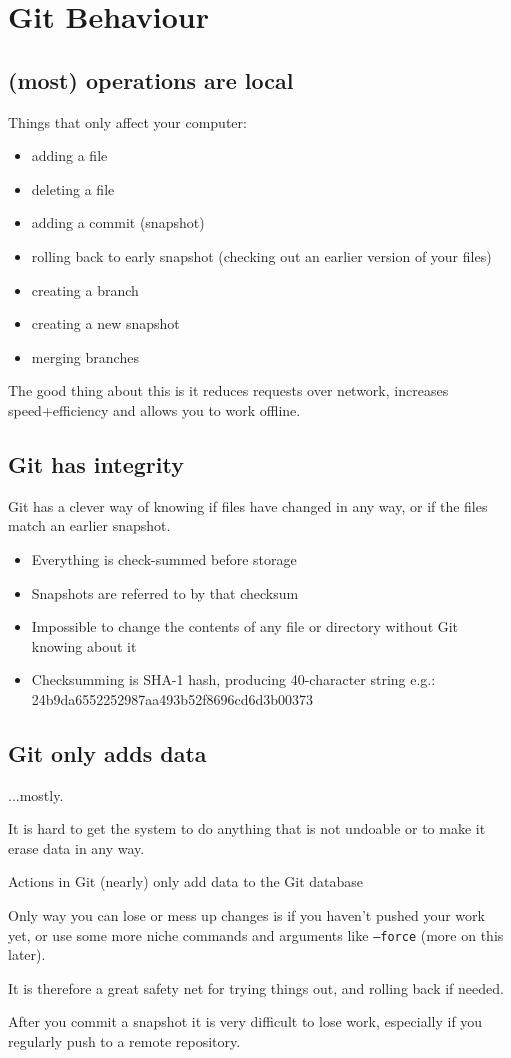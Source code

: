 \section{Git Behaviour}

\subsection{(most) operations are local}

Things that only affect your computer:

\begin{itemize}
	\item adding a file
	\item deleting a file
	\item adding a commit (snapshot)
    \item rolling back to early snapshot (checking out an earlier version of your files)
    \item creating a branch
    \item creating a new snapshot
    \item merging branches
\end{itemize}

The good thing about this is it reduces requests over network, increases speed+efficiency and allows you to work offline.

\subsection{Git has integrity}

Git has a clever way of knowing if files have changed in any way, or if the files match an earlier snapshot.

\begin{itemize}
	\item Everything is check-summed before storage
	\item Snapshots are referred to by that checksum
	\item Impossible to change the contents of any file or directory without Git knowing about it
	\item Checksumming is SHA-1 hash, producing 40-character string e.g.:
24b9da6552252987aa493b52f8696cd6d3b00373
\end{itemize}

\subsection{Git only adds data}

...mostly.

It is hard to get the system to do anything that is not undoable or to make it erase data in any way.

Actions in Git (nearly) only add data to the Git database

Only way you can lose or mess up changes is if you haven’t pushed your work yet, or use some more niche commands and arguments like \texttt{--force} (more on this later).

It is therefore a great safety net for trying things out, and rolling back if needed.

After you commit a snapshot it is very difficult to lose work, especially if you regularly push to a remote repository.
